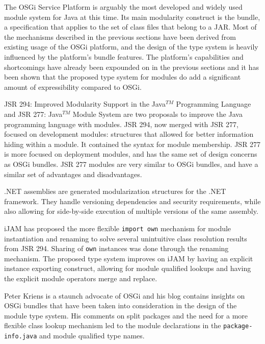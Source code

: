 The OSGi Service Platform \cite{OSGi4} is arguably the most developed and
widely used module system for Java at this time. Its main modularity 
construct is the bundle, a specification that applies to the set of class
files that belong to a JAR. Most of the mechanisms
described in the previous sections have been derived from existing usage
of the OSGi platform, and the design of the type system is heavily
influenced by the platform's bundle features. The platform's
capabilities and shortcomings have already been expounded on in the 
previous sections and it has been shown that the proposed type system
for modules do add a significant amount of expressibility compared
to OSGi.

JSR 294: Improved Modularity Support in the Java$^{TM}$ Programming Language \cite{JSR294} and
JSR 277: Java$^{TM}$ Module System \cite{JSR277} are two proposals to improve
the Java programming language with modules. JSR 294, now merged with JSR 277, focused
on development modules: structures that allowed for better information hiding within 
a module. It contained the syntax for module membership.
JSR 277 is more focused on deployment modules, and has the same set of design 
concerns as OSGi bundles. JSR 277 modules are very similar to OSGi bundles,
and have a similar set of advantages and disadvantages.

.NET assemblies \cite{netassemblies} are generated modularization structures
for the .NET framework. They handle versioning dependencies and security
requirements, while also allowing for side-by-side execution of multiple
versions of the same assembly.

iJAM \cite{iJAM} has proposed the more flexible \texttt{import own}
mechanism for module instantiation and renaming to solve several unintuitive class
resolution results from JSR 294. Sharing of \texttt{own} instances was
done through the renaming mechanism. The proposed type system improves
on iJAM by having an explicit instance exporting construct,
allowing for module qualified lookups and having the explicit module operators
merge and replace.

Peter Kriens is a staunch advocate of OSGi and his blog \cite{iJAMComments, superpackagesNoMore}
contains insights on OSGi bundles that have been taken into consideration
in the design of the module type system. His comments on split packages and
the need for a more flexible class lookup mechanism led to the module declarations
in the \texttt{package-info.java} and module qualified type names.

